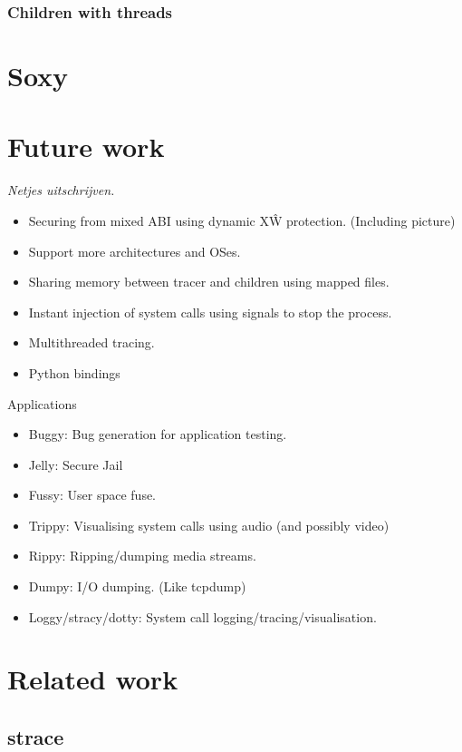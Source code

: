\documentclass[a4paper, twoside, 10pt, twocolumn]{report}
\begin{document}
%

\subsection{Children with threads}




\chapter{Soxy}

\chapter{Future work}

\textit{Netjes uitschrijven.}
\begin{itemize}
    \item Securing from mixed ABI using dynamic X\^W protection. (Including
        picture)
    \item Support more architectures and OSes.
    \item Sharing memory between tracer and children using mapped files.
    \item Instant injection of system calls using signals to stop the process.
    \item Multithreaded tracing.
    \item Python bindings
\end{itemize}

Applications
\begin{itemize}
    \item Buggy: Bug generation for application testing.
    \item Jelly: Secure Jail
    \item Fussy: User space fuse.
    \item Trippy: Visualising system calls using audio (and possibly video)
    \item Rippy: Ripping/dumping media streams.
    \item Dumpy: I/O dumping. (Like tcpdump)
    \item Loggy/stracy/dotty: System call logging/tracing/visualisation.
\end{itemize}


\chapter{Related work}

\section{strace}



\end{document}
